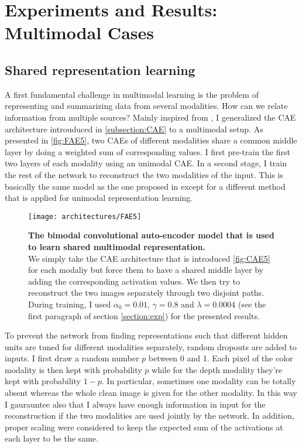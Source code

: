 \section{Experiments and Results: Multimodal Cases} \label{section:multi}

\subsection{Shared representation learning} \label{subsection:shared}

A first fundamental challenge in multimodal learning is the problem
of representing and summarizing data from several modalities.
How can we relate information from multiple sources?
Mainly inspired from \cite{J. Ngiam 2011, A. Droniou 2014},
I generalized the CAE architecture introuduced in \ref{subsection:CAE}
to a multimodal setup. As presented in \autoref{fig:FAE5}, two CAEs
of different modalities share a common middle layer by doing a weighted sum
of corresponding values. I first pre-train the first two layers
of each modality using an unimodal CAE. In a second stage, I train the
rest of the network to reconstruct the two modalities of the input.
This is basically the same model as the one proposed in
\cite{J. Ngiam 2011} except for a different method that is applied for
unimodal representation learning.

\vspace{-0.5em}
\begin{figure}[H]
  \centering
  \texttt{[image: architectures/FAE5]}
  \caption{%
    \textbf{The bimodal convolutional auto-encoder model that is
      used to learn shared multimodal representation.}\\[0.1em]
    We simply take the CAE architecture that is introduced
      \autoref{fig:CAE5} for each modaliy but force them to have a
      shared middle layer by adding the corresponding activation values.
      We then try to reconstruct the two images separately through
      two disjoint paths. During training, I used $\alpha_0=0.01$,
      $\gamma = 0.8$ and $\lambda = 0.0004$ (see the first paragraph
      of section \ref{section:exp}) for the presented results.}
  \label{fig:FAE5}
\end{figure}

To prevent the network from finding representations such that different
hidden units are tuned for different modalities separately, random
dropouts are added to inputs. I first draw a random number $p$ between
0 and 1. Each pixel of the color modality is then kept with probability $p$
while for the depth modality they're kept with probability $1-p$.
In particular, sometimes one modality can be totally absent whereas
the whole clean image is given for the other modality.
In this way I gaurauntee also that I always have enough information
in input for the reconstruction if the two modalities are
used jointly by the network.
In addition, proper scaling were considered to keep the expected
sum of the activations at each layer to be the same.

